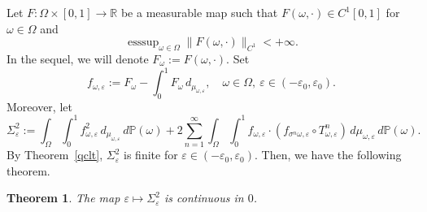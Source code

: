 \documentclass[12pt,reqno,a4paper]{article}
\newtheorem{theorem}{Theorem}
\DeclareMathOperator{\esssup}{esssup}
\begin{document}
	Let $F\colon \Omega \times [0, 1] \to \mathbb R$ be a measurable map such that $F(\omega, \cdot)\in C^1[0, 1]$ for $\omega \in \Omega$ and 
	\begin{equation}\label{observ}
		\esssup_{\omega \in \Omega}\|F(\omega, \cdot)\|_{C^1}<+\infty.
	\end{equation}
	In the sequel, we will denote $F_\omega:=F(\omega, \cdot)$. Set
	\[
	f_{\omega, \varepsilon}:=F_\omega-\int_0^1F_\omega \, d_{\mu_{\omega, \varepsilon}}, \quad \omega \in \Omega, \ \varepsilon \in (-\varepsilon_0, \varepsilon_0).
	\]
	Moreover, let 
	\begin{equation}\label{Sigmavar}
		\Sigma_\varepsilon^2:=\int_\Omega \int_0^1f_{\omega, \varepsilon}^2 \, d_{\mu_{\omega, \varepsilon}} \, d\mathbb P(\omega)+2\sum_{n=1}^\infty \int_\Omega \int_0^1 f_{\omega, \varepsilon}\cdot (f_{\sigma^n \omega, \varepsilon}\circ T_{\omega, \varepsilon}^n)\, d\mu_{\omega, \varepsilon}\, d\mathbb P(\omega).
	\end{equation}
	By Theorem~\ref{qclt}, $\Sigma_\varepsilon^2$ is finite for $\varepsilon \in (-\varepsilon_0, \varepsilon_0)$.
	Then, we have the following theorem.
	\begin{theorem}\label{contvariance}
		The map $\varepsilon \mapsto \Sigma_\varepsilon^2$ is continuous in $0$. 
	\end{theorem}
\end{document}
